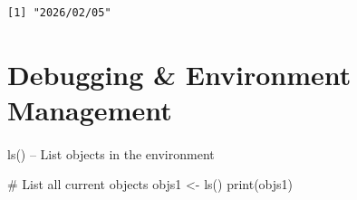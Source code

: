 \documentclass[
  letterpaper,
  DIV=11,
  numbers=noendperiod]{scrartcl}
\makeatletter
\let\oldparagraph\paragraph
\renewcommand{\paragraph}{
    \@ifstar
      \xxxParagraphStar
      \xxxParagraphNoStar
  }
\newcommand{\xxxParagraphStar}[1]{\oldparagraph*{#1}\mbox{}}
\newcommand{\xxxParagraphNoStar}[1]{\oldparagraph{#1}\mbox{}}
\newenvironment{Shaded}{\begin{snugshade}}{\end{snugshade}}
\newcommand{\CommentTok}[1]{\textcolor[rgb]{0.37,0.37,0.37}{#1}}
\newcommand{\FunctionTok}[1]{\textcolor[rgb]{0.28,0.35,0.67}{#1}}
\newcommand{\NormalTok}[1]{\textcolor[rgb]{0.00,0.23,0.31}{#1}}
\newcommand{\OtherTok}[1]{\textcolor[rgb]{0.00,0.23,0.31}{#1}}
\makeatother
\begin{document}
\begin{verbatim}
[1] "2026/02/05"
\end{verbatim}

\section{Debugging \& Environment
Management}\label{debugging-environment-management}

\paragraph{ls() -- List objects in the
environment}\label{ls-list-objects-in-the-environment}

\begin{Shaded}
\begin{Highlighting}[]
\CommentTok{\#   List all current objects}
\NormalTok{objs1 }\OtherTok{\textless{}{-}} \FunctionTok{ls}\NormalTok{()}
\FunctionTok{print}\NormalTok{(objs1)}
\end{Highlighting}
\end{Shaded}
\end{document}
